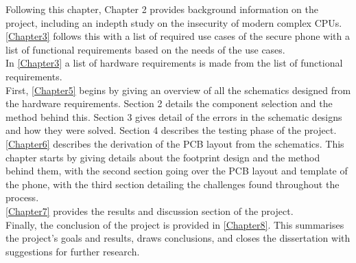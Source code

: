 Following this chapter, Chapter 2 provides background information on the project, including an indepth study on the insecurity of modern complex CPUs.\\ 
\ref{Chapter3} follows this with a list of required use cases of the secure phone with a list of functional requirements based on the needs of the use cases.\\ 
In \ref{Chapter3} a list of hardware requirements is made from the list of functional requirements.\\
First, \ref{Chapter5} begins by giving an overview of all the schematics designed from the hardware requirements.
Section 2 details the component selection and the method behind this.
Section 3 gives detail of the errors in the schematic designs and how they were solved.
Section 4 describes the testing phase of the project.\\
\ref{Chapter6} describes the derivation of the PCB layout from the schematics.
This chapter starts by giving details about the footprint design and the method behind them, with the second section going over the PCB layout and template of the phone, with the third section detailing the challenges found throughout the process.\\
\ref{Chapter7} provides the results and discussion section of the project.\\
Finally, the conclusion of the project is provided in \ref{Chapter8}.
This summarises the project's goals and results, draws conclusions, and closes the dissertation with suggestions for further research.
